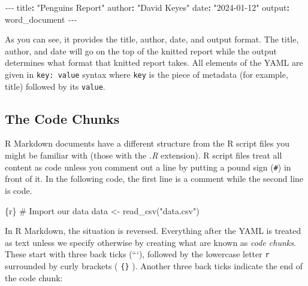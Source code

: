\documentclass[
]{book}
\newenvironment{Shaded}{\begin{snugshade}}{\end{snugshade}}
\newcommand{\AttributeTok}[1]{\textcolor[rgb]{0.77,0.63,0.00}{#1}}
\newcommand{\FunctionTok}[1]{\textcolor[rgb]{0.00,0.00,0.00}{#1}}
\newcommand{\KeywordTok}[1]{\textcolor[rgb]{0.13,0.29,0.53}{\textbf{#1}}}
\newcommand{\NormalTok}[1]{#1}
\newcommand{\PreprocessorTok}[1]{\textcolor[rgb]{0.56,0.35,0.01}{\textit{#1}}}
\newcommand{\StringTok}[1]{\textcolor[rgb]{0.31,0.60,0.02}{#1}}
\begin{document}
\begin{Shaded}
\begin{Highlighting}[]
\PreprocessorTok{{-}{-}{-}}
\FunctionTok{title}\KeywordTok{:}\AttributeTok{ }\StringTok{"Penguins Report"}
\FunctionTok{author}\KeywordTok{:}\AttributeTok{ }\StringTok{"David Keyes"}
\FunctionTok{date}\KeywordTok{:}\AttributeTok{ }\StringTok{"2024{-}01{-}12"}
\FunctionTok{output}\KeywordTok{:}\AttributeTok{ word\_document}
\PreprocessorTok{{-}{-}{-}}
\end{Highlighting}
\end{Shaded}

As you can see, it provides the title, author, date, and output format. The title, author, and date will go on the top of the knitted report while the output determines what format that knitted report takes. All elements of the YAML are given in \texttt{key:\ value} syntax where \texttt{key} is the piece of metadata (for example, title) followed by its \texttt{value}.

\hypertarget{the-code-chunks}{%
\subsection*{The Code Chunks}\label{the-code-chunks}}

R Markdown documents have a different structure from the R script files you might be familiar with (those with the \emph{.R} extension). R script files treat all content as code unless you comment out a line by putting a pound sign (\texttt{\#}) in front of it. In the following code, the first line is a comment while the second line is code.

\begin{Shaded}
\begin{Highlighting}[]
\NormalTok{\textasciigrave{}\textasciigrave{}\textasciigrave{}\{r\}}
\NormalTok{\# Import our data}
\NormalTok{data \textless{}{-} read\_csv("data.csv")}
\NormalTok{\textasciigrave{}\textasciigrave{}\textasciigrave{}}
\end{Highlighting}
\end{Shaded}

In R Markdown, the situation is reversed. Everything after the YAML is treated as text unless we specify otherwise by creating what are known as \emph{code chunks}. These start with three back ticks (```), followed by the lowercase letter \texttt{r} surrounded by curly brackets ( \texttt{\{\}} ). Another three back ticks indicate the end of the code chunk:
\end{document}
